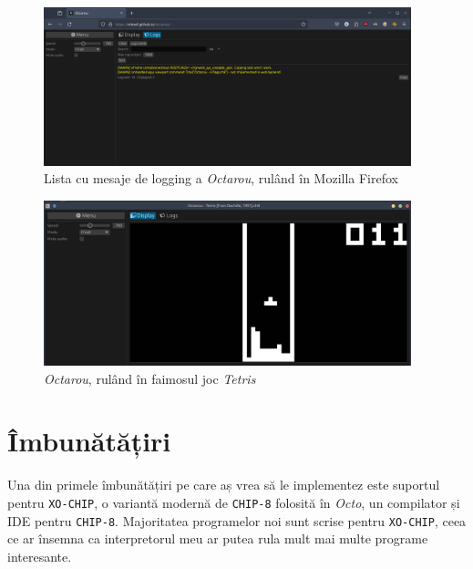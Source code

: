 \documentclass[a4paper]{article}
\begin{document}
\begin{figure}[p!]
	\begin{center}
		\includegraphics[width=0.95\textwidth]{figures/web.png}
	\end{center}
	\caption{Lista cu mesaje de logging a \textit{Octarou}, rulând în Mozilla Firefox}
\end{figure}

\begin{figure}[p!]
	\begin{center}
		\includegraphics[width=0.95\textwidth]{figures/tetris.png}
	\end{center}
	\caption{\textit{Octarou}, rulând în faimosul joc \textit{Tetris}}
\end{figure}


\section{Îmbunătățiri}
Una din primele îmbunătățiri pe care aș vrea să le implementez este suportul pentru \texttt{XO-CHIP}, o variantă modernă de \texttt{CHIP-8}
folosită în \textit{Octo}, un compilator și IDE pentru \texttt{CHIP-8}. Majoritatea programelor noi sunt scrise pentru \texttt{XO-CHIP}, ceea
ce ar însemna ca interpretorul meu ar putea rula mult mai multe programe interesante.
\end{document}
